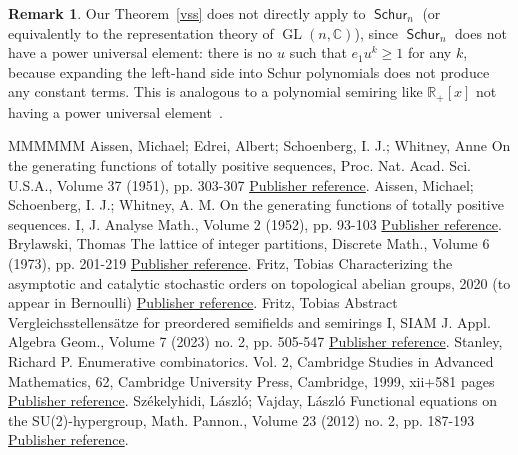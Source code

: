 \documentclass[11pt]{article}
\theoremstyle{definition}
\newtheorem{rema}[theo]{Remark}
\numberwithin{equation}{section}
\newcommand{\R}{\mathbb{R}}
\newcommand{\C}{\mathbb{C}}
\DeclareMathOperator{\GL}{GL}
\DeclareMathOperator{\Schur}{\mathsf{Schur}}
\begin{document}
\begin{rema}
	Our Theorem~\ref{vss} does not directly apply to $\Schur_n$ (or equivalently to the representation theory of $\GL(n,\C)$), since $\Schur_n$ does not have a power universal element: there is no $u$ such that $e_1 u^k \ge 1$ for any $k$, because expanding the left-hand side into Schur polynomials does not produce any constant terms.
	This is analogous to a polynomial semiring like $\R_+[x]$ not having a power universal element~\cite[Example~3.37]{vergleichsstellensatz}.
\end{rema}
\begin{thebibliography}{MMMMMM}
 Aissen, Michael; Edrei, Albert; Schoenberg, I. J.; Whitney, Anne On the generating functions of totally positive sequences, Proc. Nat. Acad. Sci. U.S.A., Volume 37 (1951), pp. 303-307 \href{https://alco.centre-mersenne.org/articles/10.5802/alco.338/#totallypositive}{Publisher reference}.
 Aissen, Michael; Schoenberg, I. J.; Whitney, A. M. On the generating functions of totally positive sequences. I, J. Analyse Math., Volume 2 (1952), pp. 93-103 \href{https://alco.centre-mersenne.org/articles/10.5802/alco.338/#totallypositiveI}{Publisher reference}.
 Brylawski, Thomas The lattice of integer partitions, Discrete Math., Volume 6 (1973), pp. 201-219 \href{https://alco.centre-mersenne.org/articles/10.5802/alco.338/#brylawski}{Publisher reference}.
 Fritz, Tobias Characterizing the asymptotic and catalytic stochastic orders on topological abelian groups, 2020 (to appear in Bernoulli) \href{https://alco.centre-mersenne.org/articles/10.5802/alco.338/#random_walks}{Publisher reference}.
 Fritz, Tobias Abstract Vergleichsstellensätze for preordered semifields and semirings I, SIAM J. Appl. Algebra Geom., Volume 7 (2023) no. 2, pp. 505-547 \href{https://alco.centre-mersenne.org/articles/10.5802/alco.338/#vergleichsstellensatz}{Publisher reference}.
 Stanley, Richard P. Enumerative combinatorics. Vol. 2, Cambridge Studies in Advanced Mathematics, 62, Cambridge University Press, Cambridge, 1999, xii+581 pages \href{https://alco.centre-mersenne.org/articles/10.5802/alco.338/#stanley2}{Publisher reference}.
 Székelyhidi, László; Vajday, László Functional equations on the SU(2)-hypergroup, Math. Pannon., Volume 23 (2012) no. 2, pp. 187-193 \href{https://alco.centre-mersenne.org/articles/10.5802/alco.338/#SV}{Publisher reference}.
\end{thebibliography}
\end{document}
